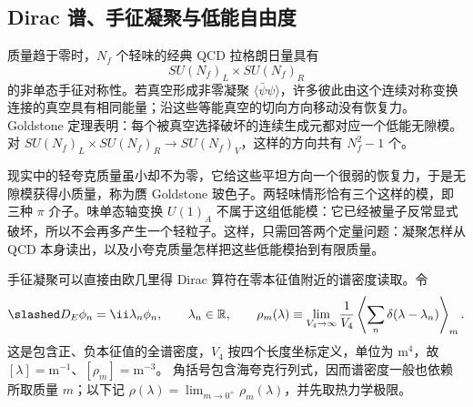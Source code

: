 \subsection{Dirac 谱、手征凝聚与低能自由度}

质量趋于零时，$N_f$ 个轻味的经典 QCD 拉格朗日量具有
\begin{equation*}
 SU(N_f)_L\times SU(N_f)_R
\end{equation*}
的非单态手征对称性。若真空形成非零凝聚 $\langle\bar\psi\psi\rangle$，许多彼此由这个连续对称变换连接的真空具有相同能量；沿这些等能真空的切向方向移动没有恢复力。Goldstone 定理表明：每个被真空选择破坏的连续生成元都对应一个低能无隙模。对 $SU(N_f)_L\times SU(N_f)_R\to SU(N_f)_V$，这样的方向共有 $N_f^2-1$ 个。

现实中的轻夸克质量虽小却不为零，它给这些平坦方向一个很弱的恢复力，于是无隙模获得小质量，称为赝 Goldstone 玻色子。两轻味情形恰有三个这样的模，即三种 \(\pi\) 介子。味单态轴变换 $U(1)_A$ 不属于这组低能模：它已经被量子反常显式破坏，所以不会再多产生一个轻粒子。这样，只需回答两个定量问题：凝聚怎样从 QCD 本身读出，以及小夸克质量怎样把这些低能模抬到有限质量。

\begin{definition}
手征凝聚可以直接由欧几里得 Dirac 算符在零本征值附近的谱密度读取。令
\begin{equation}
 \slashed D_E\phi_n=\ii\lambda_n\phi_n,
 \qquad \lambda_n\in\mathbb R,
 \qquad
 \rho_m(\lambda)\equiv\lim_{V_4\to\infty}\frac1{V_4}\left\langle\sum_n\delta(\lambda-\lambda_n)\right\rangle_m.
 \label{eq:qcd-dirac-spectral-density-dp68}
\end{equation}
这是包含正、负本征值的全谱密度，$V_4$ 按四个长度坐标定义，单位为
$\mathrm{m^4}$，故 $[\lambda]=\mathrm{m^{-1}}$、$[\rho_m]=\mathrm{m^{-3}}$。
角括号包含海夸克行列式，因而谱密度一般也依赖所取质量 $m$；以下记
$\rho(\lambda)=\lim_{m\to0^+}\rho_m(\lambda)$，并先取热力学极限。
\end{definition}

